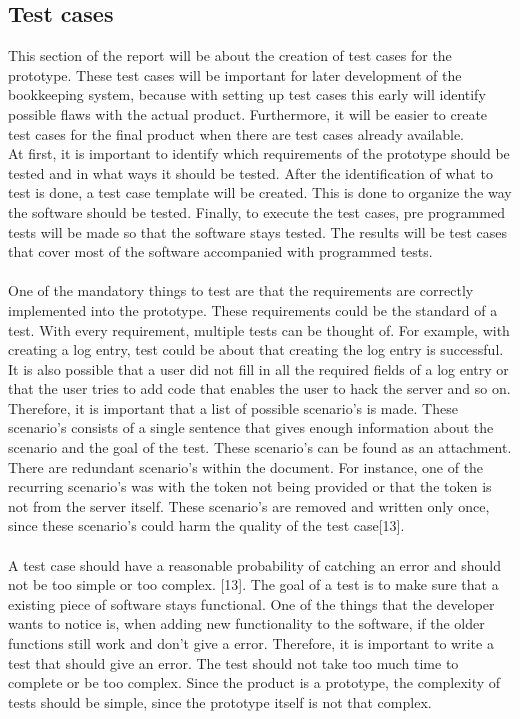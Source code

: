 \documentclass[paper=a4, fontsize=11pt,twoside]{scrartcl}	%
\begin{document}
\newpage
\subsection{Test cases}
This section of the report will be about the creation of test cases for the prototype. These test cases will be important for later development of the bookkeeping system, because with setting up test cases this early will identify possible flaws with the actual product.
Furthermore, it will be easier to create test cases for the final product when there are test cases already available. \\
At first, it is important to identify which requirements of the prototype should be tested and in what ways it should be tested. After the identification of what to test is done, a test case template will be created. This is done to organize the way the software should be tested. Finally, to execute the test cases, pre programmed tests will be made so that the software stays tested. The results will be test cases that cover most of the software accompanied with programmed tests. \\ \\
One of the mandatory things to test are that the requirements are correctly implemented into the prototype. These requirements could be the standard of a test. With every requirement, multiple tests can be thought of. For example, with creating a log entry, test could be about that creating the log entry is successful. It is also possible that a user did not fill in all the required fields of a log entry or that the user tries to add code that enables the user to hack the server and so on.  \\
Therefore, it is important that a list of possible scenario's is made. These scenario's consists of a single sentence that gives enough information about the scenario and the goal of the test. These scenario's can be found as an attachment. There are redundant scenario's within the document. For instance, one of the recurring scenario's was with the token not being provided or that the token is not from the server itself. These scenario's are removed and written only once, since these scenario's could harm the quality of the test case[13]. \\ \\
A test case should have a reasonable probability of catching an error and should not be too simple or too complex. [13]. The goal of a test is to make sure that a existing piece of software stays functional. One of the things that the developer wants to notice is, when adding new functionality to the software, if the older functions still work and don't give a error. Therefore, it is important to write a test  that should give an error. The test should not take too much time to complete or be too complex. Since the product is a prototype, the complexity of tests should be simple, since the prototype itself is not that complex. \\ 
\end{document}
